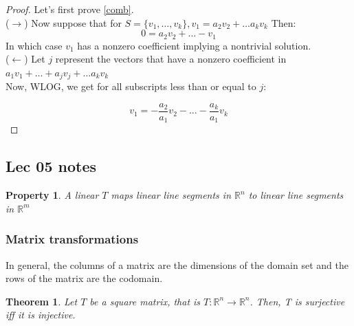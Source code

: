 \documentclass[titlepage]{article}
\newtheorem{thm}{Theorem}[subsection]
\newtheorem{property}{Property}
\numberwithin{equation}{subsection}
\begin{document}
\begin{proof}
Let's first prove \ref{comb}.
\\
($\rightarrow$)
   Now suppose that for $S = \{ v_{1}, \ldots , v_{k}\}, v_{1} = a_{2}v_{2} + \ldots a_{k}v_{k}$ Then:
   $$ 0 = a_{2}v_{2} + \ldots - v_{1}$$
   In which case $v_{1}$ has a nonzero coefficient implying a nontrivial solution. 
   \\
($\leftarrow$)
Let $j$ represent the vectors that have a nonzero coefficient in $a_{1}v_{1} + \ldots + a_{j}v_{j} + \ldots a_{k}v_{k}$
\\
Now, WLOG, we get for all subscripts less than or equal to $j$:

$$ v_{1} = - \frac{a_{2}}{a_{1}}v_{2} - \ldots - \frac{a_{k}}{a_{1}}v_{k}$$
    \tag*{\qedhere}
\end{proof}

\subsection{Lec 05 notes}

\begin{property}
A linear $T$ maps linear line segments in $\mathbb{R}^{n}$ to linear line segments in $\mathbb{R}^{m}$ 
\end{property}

\subsubsection{Matrix transformations}

\begin{tcolorbox}
  In general, the columns of a matrix are the dimensions of the domain set and the rows of the matrix are the codomain. 
\end{tcolorbox}

\begin{thm}
Let $T$ be a square matrix, that is $T:\mathbb{R}^n \to \mathbb{R}^n$. Then, T is surjective iff it is injective. 
\end{thm}
\end{document}
